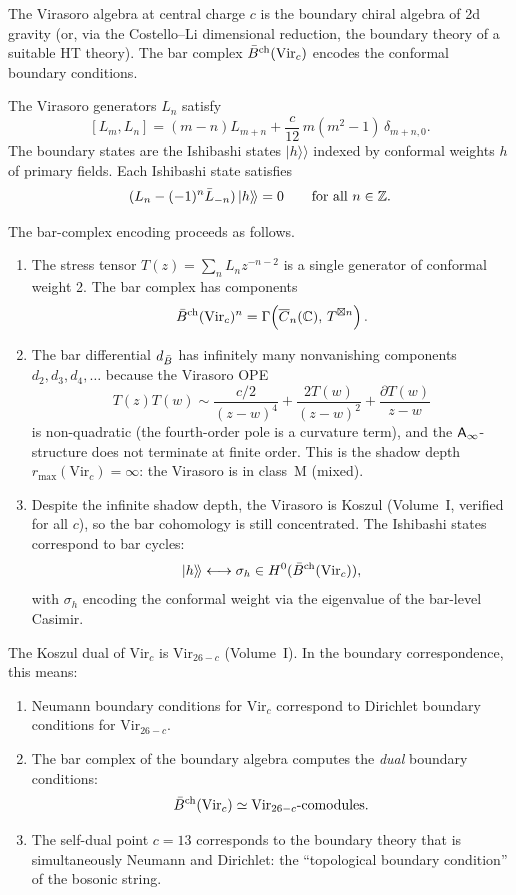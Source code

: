 \begin{construction}
The Virasoro algebra at central charge $c$ is the boundary chiral
algebra of 2d gravity (or, via the Costello--Li dimensional reduction,
the boundary theory of a suitable HT theory). The bar complex
$\bar{B}^{\mathrm{ch}}(\mathrm{Vir}_c)$ encodes the conformal boundary conditions.

The Virasoro generators $L_n$ satisfy
\[
[L_m, L_n] = (m - n) L_{m+n} + \frac{c}{12}\, m(m^2 - 1)\, \delta_{m+n,0}.
\]
The boundary states are the Ishibashi states $|h\rangle\!\rangle$
indexed by conformal weights $h$ of primary fields. Each Ishibashi state
satisfies
\[
(L_n - (-1)^n \bar{L}_{-n})\, |h\rangle\!\rangle = 0
\qquad \text{for all } n \in \mathbb{Z}.
\]

The bar-complex encoding proceeds as follows.
\begin{enumerate}
\item The stress tensor $T(z) = \sum_n L_n z^{-n-2}$ is a single
 generator of conformal weight 2. The bar complex has components
 \[
 \bar{B}^{\mathrm{ch}}(\mathrm{Vir}_c)^n
 = \Gamma\!\left(\overline{C}_n(\mathbb{C}),\, T^{\boxtimes n}\right).
 \]
\item The bar differential $d_{\bar{B}}$ has infinitely many nonvanishing
 components $d_2, d_3, d_4, \ldots$ because the Virasoro OPE
 \[
 T(z) T(w) \sim \frac{c/2}{(z-w)^4}
 + \frac{2T(w)}{(z-w)^2}
 + \frac{\partial T(w)}{z-w}
 \]
 is non-quadratic (the fourth-order pole is a curvature term), and the
 $\mathsf{A}_{\infty}$-structure does not terminate at finite order. This is the
 shadow depth $r_{\max}(\mathrm{Vir}_c) = \infty$: the Virasoro is in
 class~M (mixed).
\item Despite the infinite shadow depth, the Virasoro is Koszul
 (Volume~I, verified for all $c$), so the bar cohomology is still
 concentrated. The Ishibashi states correspond to bar cycles:
 \[
 |h\rangle\!\rangle
 \longleftrightarrow
 \sigma_h \in H^0(\bar{B}^{\mathrm{ch}}(\mathrm{Vir}_c)),
 \]
 with $\sigma_h$ encoding the conformal weight via the
 eigenvalue of the bar-level Casimir.
\end{enumerate}
\end{construction}

\begin{proposition}
The Koszul dual of $\mathrm{Vir}_c$ is $\mathrm{Vir}_{26-c}$
(Volume~I). In the boundary correspondence, this means:
\begin{enumerate}
\item Neumann boundary conditions for $\mathrm{Vir}_c$ correspond to
 Dirichlet boundary conditions for $\mathrm{Vir}_{26-c}$.
\item The bar complex of the boundary algebra computes the
 \emph{dual} boundary conditions:
 \[
 \bar{B}^{\mathrm{ch}}(\mathrm{Vir}_c) \simeq
 \mathrm{Vir}_{26-c}\text{-comodules}.
 \]
\item The self-dual point $c = 13$ corresponds to the boundary
 theory that is simultaneously Neumann and Dirichlet: the
 ``topological boundary condition'' of the bosonic string.
\end{enumerate}
\end{proposition}

